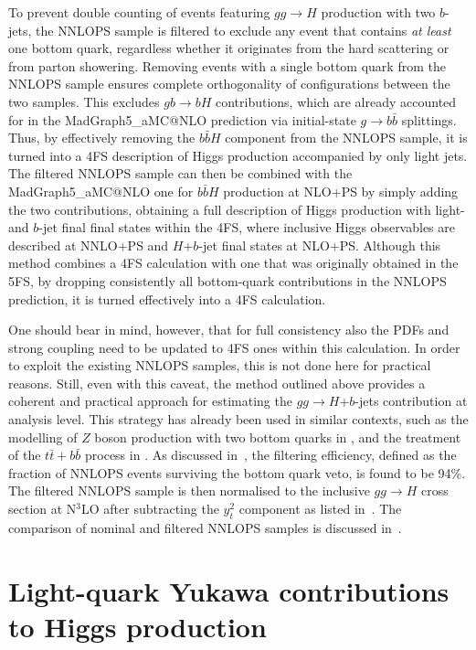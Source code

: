 \documentclass[11pt,a4paper]{article}
\begin{document}
To prevent double counting of events featuring $gg \to H$ production with two $b$-jets, the {\sc NNLOPS} sample is filtered to exclude any event that contains 
{\it at least} one bottom quark, regardless whether it originates from the hard scattering or from parton showering. 
Removing events with a single bottom quark from the {\sc NNLOPS} sample ensures complete orthogonality of configurations between the two samples. 
This excludes $g  b \to b H$ contributions, which are already accounted for in the {\sc MadGraph5\_aMC@NLO} prediction via initial-state $g \to b\bar{b}$ splittings. Thus, by effectively removing the $b\bar{b}H$ component from the {\sc NNLOPS} sample, it is turned 
into a 4FS description of Higgs production accompanied by 
only light jets. The filtered {\sc NNLOPS} sample can then be combined with the {\sc MadGraph5\_aMC@NLO} one for 
$b\bar{b}H$ production at NLO+PS by simply adding the two contributions, obtaining a full description of Higgs production with light- and $b$-jet
final final states within the 4FS, where inclusive Higgs observables are described at NNLO+PS and $H$+$b$-jet final states at NLO+PS. 
Although this method combines a 4FS calculation with one that was originally obtained in the 5FS, by dropping consistently all bottom-quark contributions
in the NNLOPS prediction, it is turned effectively into a 4FS calculation.

One should bear in mind, however, that for full consistency also the PDFs and strong
coupling need to be updated to 4FS ones within this calculation. In order to exploit the existing NNLOPS samples, this is not done here for practical reasons.
Still, even with this caveat, the method outlined above provides a coherent and practical approach for estimating the $gg \to H$+$b$-jets contribution at analysis level. 
This strategy has already been used in similar contexts, such as the modelling of $Z$ boson production with two bottom quarks in , and the treatment of the $t\bar{t}+b\bar{b}$ process in .  
As discussed in~, the filtering efficiency, defined as the fraction of {\sc NNLOPS} events surviving the bottom quark veto, is found to be 94\%. The filtered {\sc NNLOPS} sample is then normalised to the inclusive $gg \to H$ cross section at N$^3$LO after subtracting the $y_t^2$ \bbH{} component as listed in~. The comparison of nominal and filtered {\sc NNLOPS} samples is discussed in~.


\section{Light-quark Yukawa contributions to Higgs production}\label{sec:lightYukawa}
\end{document}
